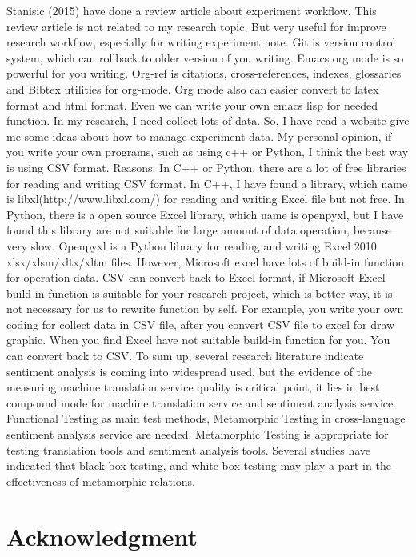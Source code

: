 \documentclass[conference]{IEEEtran}
\begin{document}
Stanisic (2015) have done a review article about experiment workflow. This review article is not related to my research topic, But very useful for improve research workflow, especially for writing experiment note. Git is version control system, which can rollback to older version of you writing. Emacs org mode is so powerful for you writing. Org-ref is citations, cross-references, indexes, glossaries and Bibtex utilities for org-mode. Org mode also can easier convert to latex format and html format. Even we can write your own emacs lisp for needed function.
In my research, I need collect lots of data. So, I have read a website give me some ideas about how to manage experiment data. My personal opinion, if you write your own programs, such as using c++ or Python, I think the best way is using CSV format. Reasons:
In C++ or Python, there are a lot of free libraries for reading and writing CSV format.
In C++, I have found a library, which name is libxl(http://www.libxl.com/) for reading and writing Excel file but not free.
In Python, there is a open source Excel library, which name is openpyxl, but I have found this library are not suitable for large amount of data operation, because very slow. Openpyxl is a Python library for reading and writing Excel 2010 xlsx/xlsm/xltx/xltm files.
However, Microsoft excel have lots of build-in function for operation data. CSV can convert back to Excel format, if Microsoft Excel build-in function is suitable for your research project, which is better way, it is not necessary for us to rewrite function by self. For example, you write your own coding for collect data in CSV file, after you convert CSV file to excel for draw graphic. When you find Excel have not suitable build-in function for you. You can convert back to CSV.
To sum up, several research literature indicate sentiment analysis is coming into widespread used, but the evidence of the measuring machine translation service quality is critical point, it lies in best compound mode for machine translation service and sentiment analysis service. Functional Testing as main test methods, Metamorphic Testing in cross-language sentiment analysis service are needed. Metamorphic Testing is appropriate for testing translation tools and sentiment analysis tools. Several studies have indicated that black-box testing, and white-box testing may play a part in the effectiveness of metamorphic relations.





\section*{Acknowledgment}


\end{document}
